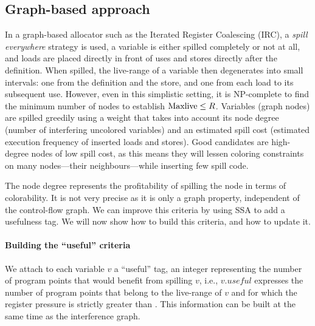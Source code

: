 {\subsection{Graph-based approach}


In a graph-based allocator such as the Iterated Register Coalescing (IRC), a \emph{spill everywhere} strategy is used, a variable is either spilled completely or not at all, and loads are placed directly in front of uses and stores directly after the definition.
When spilled, the live-range of a variable then degenerates into small intervals: one from the definition and the store, and one from each load to its subsequent use.
However, even in this simplistic setting, it is NP-complete to find the minimum number of nodes to establish $\mathrm{Maxlive}\le R$.
Variables (graph nodes) are spilled greedily using a weight that takes into account its node degree (number of interfering uncolored variables) and an estimated spill cost (estimated execution frequency of inserted loads and stores).
Good candidates are high-degree nodes of low spill cost, as this means they will lessen coloring constraints on many nodes---their neighbours---while inserting few spill code.

The node degree represents the profitability of spilling the node in terms of colorability.
It is not very precise as it is only a graph property, independent of the control-flow graph.
We can improve this criteria by using SSA to add a usefulness tag.
We will now show how to build this criteria, and how to update it.

\paragraph{Building the ``useful'' criteria}

We attach to each variable $v$ a ``useful'' tag, an integer representing the number of program points that would benefit from spilling $v$, i.e., $v.\textit{useful}$ expresses the number of program points that belong to the live-range of $v$ and for which the register pressure is strictly greater than \regs.
This information can be built at the same time as the interference graph.

}
